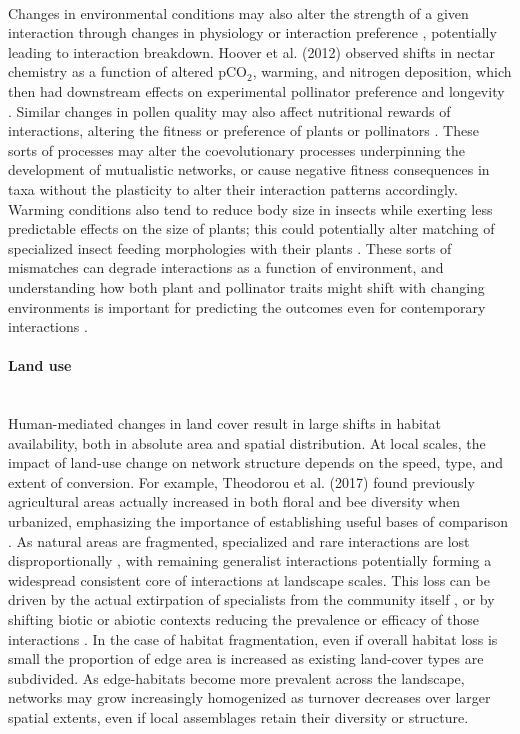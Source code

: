     \paragraph*{}
    Changes in environmental conditions may also alter the strength of a given interaction through changes in physiology or interaction preference \parencite{cruz2023mutualisms}, potentially leading to interaction breakdown. Hoover et al. (2012) observed shifts in nectar chemistry as a function of altered pCO$_2$, warming, and nitrogen deposition, which then had downstream effects on experimental pollinator preference and longevity \parencite{hoover2012warming}. Similar changes in pollen quality may also affect nutritional rewards of interactions, altering the fitness or preference of plants or pollinators \parencite{gerard2020global}. These sorts of processes may alter the coevolutionary processes underpinning the development of mutualistic networks, or cause negative fitness consequences in taxa without the plasticity to alter their interaction patterns accordingly. Warming conditions also tend to reduce body size in insects while exerting less predictable effects on the size of plants; this could potentially alter matching of specialized insect feeding morphologies with their plants \parencite{gerard2020global}. These sorts of mismatches can degrade interactions as a function of environment, and understanding how both plant and pollinator traits might shift with changing environments is important for predicting the outcomes even for contemporary interactions \parencite{cruz2023mutualisms}.
    
\paragraph*{Land use}\mbox{}\\
Human-mediated changes in land cover result in large shifts in habitat availability, both in absolute area and spatial distribution. At local scales, the impact of land-use change on network structure depends on the speed, type, and extent of conversion. For example, Theodorou et al. (2017) found previously agricultural areas actually increased in both floral and bee diversity when urbanized, emphasizing the importance of establishing useful bases of comparison \parencite{theodorou2017structure}. As natural areas are fragmented, specialized and rare interactions are lost disproportionally \parencite{aizen2012specialization}, with remaining generalist interactions potentially forming a widespread consistent core of interactions at landscape scales. This loss can be driven by the actual extirpation of specialists from the community itself \parencite{maurer2024landscape}, or by shifting biotic or abiotic contexts reducing the prevalence or efficacy of those interactions \parencite{birkenbach2024land}. In the case of habitat fragmentation, even if overall habitat loss is small the proportion of edge area is increased as existing land-cover types are subdivided. As edge-habitats become more prevalent across the landscape, networks may grow increasingly homogenized as turnover decreases over larger spatial extents, even if local assemblages retain their diversity or structure. 

